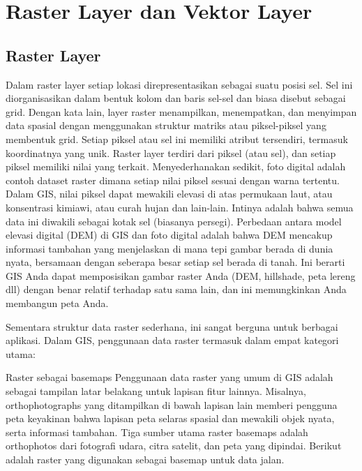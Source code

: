

\section{Raster Layer dan Vektor Layer}

\subsection{Raster Layer}
Dalam raster layer  setiap lokasi direpresentasikan sebagai suatu posisi sel. 
Sel ini diorganisasikan dalam bentuk kolom dan baris sel-sel dan biasa disebut sebagai grid. 
Dengan kata lain,  layer raster menampilkan, menempatkan, 
dan menyimpan data spasial dengan menggunakan struktur matriks atau piksel-piksel yang membentuk grid. 
Setiap piksel atau sel ini memiliki atribut tersendiri, termasuk koordinatnya yang unik.
Raster layer terdiri dari piksel (atau sel), dan setiap piksel memiliki nilai yang terkait. Menyederhanakan sedikit, foto digital adalah contoh dataset raster dimana setiap nilai piksel sesuai dengan warna tertentu. Dalam GIS, nilai piksel dapat mewakili elevasi di atas permukaan laut, atau konsentrasi kimiawi, atau curah hujan dan lain-lain. Intinya adalah bahwa semua data ini diwakili sebagai kotak sel (biasanya persegi). Perbedaan antara model elevasi digital (DEM) di GIS dan foto digital adalah bahwa DEM mencakup informasi tambahan yang menjelaskan di mana tepi gambar berada di dunia nyata, bersamaan dengan seberapa besar setiap sel berada di tanah. Ini berarti GIS Anda dapat memposisikan gambar raster Anda (DEM, hillshade, peta lereng dll) dengan benar relatif terhadap satu sama lain, dan ini memungkinkan Anda membangun peta Anda.

Sementara struktur data raster sederhana, ini sangat berguna untuk berbagai aplikasi. Dalam GIS, penggunaan data raster termasuk dalam empat kategori utama:

Raster sebagai basemaps
Penggunaan data raster yang umum di GIS adalah sebagai tampilan latar belakang untuk lapisan fitur lainnya. Misalnya,
orthophotographs yang ditampilkan di bawah lapisan lain memberi pengguna peta keyakinan bahwa lapisan peta selaras spasial 
dan mewakili objek nyata, serta informasi tambahan. Tiga sumber utama raster basemaps adalah orthophotos dari fotografi udara,
citra satelit, dan peta yang dipindai. Berikut adalah raster yang digunakan sebagai basemap untuk data jalan.

